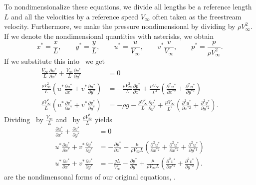 To nondimensionalize these equations, we divide all lengths be a reference length $L$ and all the velocities by a reference speed $V_{\infty}$ often taken as the freestream velocity. Furthermore, we make the pressure nondimensional by dividing by $\rho V^2_{\infty}$. If we denote the nondimensional quantities with asterisks, we obtain
\[ 
x^{*} = \frac{x}{L}, \qquad y^{*} = \frac{y}{L}, \qquad u^{*} = \frac{u}{V_{\infty}}, \qquad v^{*} \frac{v}{V_{\infty}}, \qquad p^{*} = \frac{p}{\rho V^2_{\infty}}
.\]
If we substitute this into~ we get
\begin{align}
  \frac{V_{\infty}}{L} \frac{\partial u^{*}}{\partial x^{*}}  + \frac{V_{\infty}}{L} \frac{\partial v^{*}}{\partial y^{*}} &= 0 \label{eq:mcons2dsubs} \\
  \frac{\rho V^2_{\infty}}{L} \left( u^{*} \frac{\partial u^{*}}{\partial x^{*}} + v^{*} \frac{\partial u^{*}}{\partial y^{*}}  \right) &= - \frac{\rho V^2_{\infty}}{L} \frac{\partial p^{*}}{\partial x^{*}} + \frac{\mu V_{\infty}}{L^2} \left( \frac{\partial^2 u^{*}}{\partial x^{*2}} + \frac{\partial^2 u^{*} }{\partial y^{*2}}  \right) \label{eq:ns2dsubs1} \\
  \frac{\rho V_{\infty}^2}{L} \left( u^{*} \frac{\partial v^{*}}{\partial x^{*}} + v^{*} \frac{\partial v^{*}}{\partial y^{*}}  \right) &= - \rho g - \frac{\rho V_{\infty}^2}{L} \frac{\partial p^{*}}{\partial y^{*}}  + \frac{\mu V_{\infty}}{L^2} \left( \frac{\partial ^2 u^{*}}{\partial x^{*2}} + \frac{\partial ^2 v^{*}}{\partial y^{*2}}  \right) \label{eq:ns2subs2}
.\end{align}
Dividing~ by $\frac{V_{\infty}}{L}$ and~ by $\frac{\rho V_{\infty}^2}{L}$ yields
\begin{align}
  \frac{\partial u^{*}}{\partial x^{*}}  + \frac{\partial v^{*}}{\partial y^{*}} &= 0 \label{eq:mc2dnondim} \\
  u^{*} \frac{\partial u^{*}}{\partial x^{*}} + v^{*} \frac{\partial y^{*}}{\partial y^{*}} &= - \frac{\partial p^{*}}{\partial x^{*}}  + \frac{\mu}{\rho V_{\infty}L} \left( \frac{\partial ^2 u^{*}}{\partial x^{*2}} + \frac{\partial ^2 u^{*}}{\partial x^{*2}} + \frac{\partial ^2 u^{*}}{\partial y^{*1}}  \right) \label{eq:ns2dnondim1} \\
  u^{*} \frac{\partial v^{*}}{\partial x^{*}} + v^{*} \frac{\partial v^{*}}{\partial y^{*}} &= - \frac{gL}{V_{\infty}^2} - \frac{\partial p^{*}}{\partial y^{*}} + \frac{\mu}{\rho V_{\infty}L} \left( \frac{\partial ^2 v^{*}}{\partial x^{*2}} + \frac{\partial ^2 v^{*}}{\partial y^{*2}}  \right) \label{eq:ns2dnondim2}
.\end{align}
 are the nondimensonal forms of our original equations, . 


